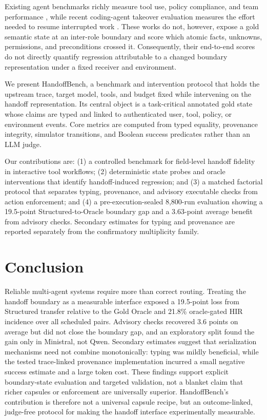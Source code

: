 \documentclass[letterpaper]{article}
\begin{document}
Existing agent benchmarks richly measure tool use, policy compliance, and team
performance \citep{liu2024agentbench,yao2024taubench,lu2025toolsandbox,zhu2025multiagentbench},
while recent coding-agent takeover evaluation measures the effort needed to
resume interrupted work \citep{kc2026handoff}. These works do not, however, expose a gold semantic
state at an inter-role boundary and score which atomic facts, unknowns,
permissions, and preconditions crossed it. Consequently, their end-to-end
scores do not directly quantify regression attributable to a changed boundary
representation under a fixed receiver and environment.

We present HandoffBench, a benchmark and intervention protocol that holds the
upstream trace, target model, tools, and budget fixed while intervening on the
handoff representation. Its central object is a task-critical annotated gold
state whose claims are typed and linked to authenticated user, tool, policy, or
environment events. Core metrics are computed from typed equality, provenance
integrity, simulator transitions, and Boolean success predicates rather than an
LLM judge.

Our contributions are: (1) a controlled benchmark for field-level
handoff fidelity in interactive tool workflows; (2) deterministic state probes
and oracle interventions that identify handoff-induced regression; and (3) a matched
factorial protocol that separates typing, provenance, and advisory executable
checks from action enforcement; and (4) a pre-execution-sealed 8,800-run evaluation
showing a 19.5-point Structured-to-Oracle boundary gap and a 3.63-point average
benefit from advisory checks. Secondary estimates for typing and provenance are
reported separately from the confirmatory multiplicity family.







\section{Conclusion}

Reliable multi-agent systems require more than correct routing. Treating the
handoff boundary as a measurable interface exposed a 19.5-point loss from
Structured transfer relative to the Gold Oracle and 21.8\% oracle-gated HIR
incidence over all scheduled pairs. Advisory checks recovered 3.6 points on
average but did not close the boundary gap, and an exploratory split found the
gain only in Ministral, not Qwen. Secondary estimates suggest that serialization
mechanisms need not combine monotonically: typing was mildly beneficial, while
the tested trace-linked provenance implementation incurred a small negative
success estimate and a large token cost. These findings support explicit boundary-state evaluation and
targeted validation, not a blanket claim that richer capsules or enforcement
are universally superior. HandoffBench's contribution is therefore not a
universal capsule recipe, but an outcome-linked, judge-free protocol for making
the handoff interface experimentally measurable.


\end{document}
